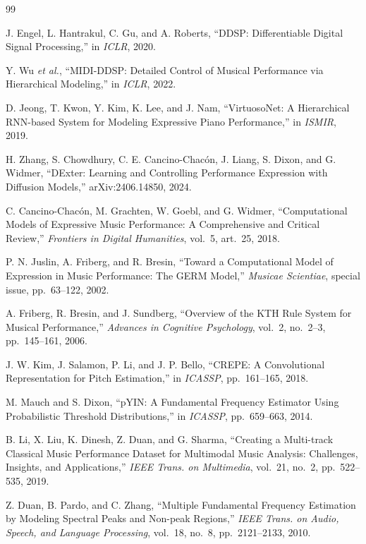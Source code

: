 \documentclass[a4paper, UTF8, zihao=-4, fontset=fandol]{ctexart}
\begin{document}

\begin{thebibliography}{99}

 J. Engel, L. Hantrakul, C. Gu, and A. Roberts, ``DDSP: Differentiable Digital Signal Processing,'' in \emph{ICLR}, 2020.

 Y. Wu \emph{et al.}, ``MIDI-DDSP: Detailed Control of Musical Performance via Hierarchical Modeling,'' in \emph{ICLR}, 2022.

 D. Jeong, T. Kwon, Y. Kim, K. Lee, and J. Nam, ``VirtuosoNet: A Hierarchical RNN-based System for Modeling Expressive Piano Performance,'' in \emph{ISMIR}, 2019.

 H. Zhang, S. Chowdhury, C. E. Cancino-Chac\'on, J. Liang, S. Dixon, and G. Widmer, ``DExter: Learning and Controlling Performance Expression with Diffusion Models,'' arXiv:2406.14850, 2024.

 C. Cancino-Chac\'on, M. Grachten, W. Goebl, and G. Widmer, ``Computational Models of Expressive Music Performance: A Comprehensive and Critical Review,'' \emph{Frontiers in Digital Humanities}, vol.~5, art.~25, 2018.

 P. N. Juslin, A. Friberg, and R. Bresin, ``Toward a Computational Model of Expression in Music Performance: The GERM Model,'' \emph{Musicae Scientiae}, special issue, pp.~63--122, 2002.

 A. Friberg, R. Bresin, and J. Sundberg, ``Overview of the KTH Rule System for Musical Performance,'' \emph{Advances in Cognitive Psychology}, vol.~2, no.~2--3, pp.~145--161, 2006.

 J. W. Kim, J. Salamon, P. Li, and J. P. Bello, ``CREPE: A Convolutional Representation for Pitch Estimation,'' in \emph{ICASSP}, pp.~161--165, 2018.

 M. Mauch and S. Dixon, ``pYIN: A Fundamental Frequency Estimator Using Probabilistic Threshold Distributions,'' in \emph{ICASSP}, pp.~659--663, 2014.

 B. Li, X. Liu, K. Dinesh, Z. Duan, and G. Sharma, ``Creating a Multi-track Classical Music Performance Dataset for Multimodal Music Analysis: Challenges, Insights, and Applications,'' \emph{IEEE Trans. on Multimedia}, vol.~21, no.~2, pp.~522--535, 2019.

 Z. Duan, B. Pardo, and C. Zhang, ``Multiple Fundamental Frequency Estimation by Modeling Spectral Peaks and Non-peak Regions,'' \emph{IEEE Trans. on Audio, Speech, and Language Processing}, vol.~18, no.~8, pp.~2121--2133, 2010.


\end{thebibliography}
\end{document}
